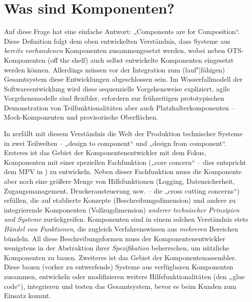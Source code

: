 \documentclass[11pt,a4paper]{article}
\begin{document}
\section{Was sind Komponenten?}

Auf diese Frage hat \cite{Szyperski2002} eine einfache Antwort: „Components
are for Composition“.  Diese Definition folgt dem oben entwickelten
Verständnis, dass Systeme aus \emph{bereits vorhandenen} Komponenten
zusammengesetzt werden, wobei neben OTS-Komponenten (off the shelf) auch
selbst entwickelte Komponenten eingesetzt werden können. Allerdings müssen vor
der Integration zum (lauf"|fähigen) Gesamtsystem diese Entwicklungen
abgeschlossen sein. Im Wasserfallmodell der Softwareentwicklung wird diese
sequenzielle Vorgehensweise expliziert, agile Vorgehensmodelle sind flexibler,
erfordern zur frühzeitigen prototypischen Demonstration von
Teilfunktionalitäten aber auch Platzhalterkomponenten -- Mock-Komponenten und
provisorische Oberflächen.

In \cite{Szyperski2002} zerfällt mit diesem Verständnis die Welt der
Produktion technischer Systeme in zwei Teilwelten -- „design to component“ und
„design from component“. Ersteres ist das Gebiet der Komponentenentwickler mit
dem Fokus, Komponenten mit einer speziellen Fachfunktion („core concern“ --
dies entspricht dem MPV in \cite{TESE2018}) zu entwickeln. Neben dieser
Fachfunktion muss die Komponente aber noch eine größere Menge von
Hilfsfunktionen (Logging, Datensicherheit, Zugangsmanagement,
Druckeransteuerung usw. -- die „cross cutting concerns“) erfüllen, die auf
etablierte Konzepte (Beschreibungsdimension) und andere zu integrierende
Komponenten (Vollzugdimension) \emph{anderer technischer Prinzipien und
  Systeme} zurückgreifen.  Komponenten sind in einem solchen Verständnis stets
\emph{Bündel von Funktionen}, die zugleich Verfahrenswissen aus
\emph{mehreren} Bereichen bündeln.  All diese Beschreibungsformen muss der
Komponentenentwickler wenigstens in der Abstraktion ihrer \emph{Spezifikation}
beherrschen, um nützliche Komponenten zu bauen.  Zweiteres ist das Gebiet der
Komponentenassembler. Diese bauen (vorher zu entwerfende) Systeme aus
verfügbaren Komponenten zusammen, entwickeln oder modifizieren weitere
Hilfsfunktionalitäten (den „glue code“), integrieren und testen das
Gesamtsystem, bevor es beim Kunden zum Einsatz kommt.
\end{document}
